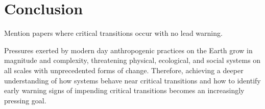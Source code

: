 \section{Conclusion}
\label{sec:conclusion}


Mention papers where critical transitions occur with no lead warning.


Pressures exerted by modern day anthropogenic practices on the Earth grow in magnitude and complexity, threatening physical, ecological, and social systems on all scales with unprecedented forms of change. Therefore, achieving a deeper understanding of how systems behave near critical transitions and how to identify early warning signs of impending critical transitions becomes an increasingly pressing goal. 